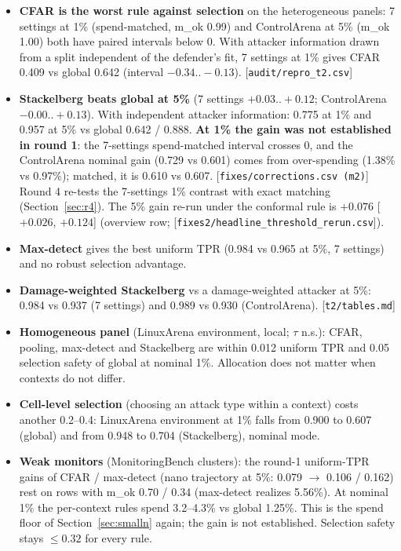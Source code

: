 \documentclass[11pt]{article}
\newcommand{\src}[1]{{\footnotesize\textcolor{ink2}{[\nolinkurl{#1}]}}}
\begin{document}
\begin{itemize}
\item \textbf{CFAR is the worst rule against selection} on the heterogeneous panels: 7 settings at 1\% (spend-matched, m\_ok 0.99) and ControlArena at 5\% (m\_ok 1.00) both have paired intervals below 0. With attacker information drawn from a split independent of the defender's fit, 7 settings at 1\% gives CFAR 0.409 vs global 0.642 (interval $-0.34..-0.13$). \src{audit/repro_t2.csv}
\item \textbf{Stackelberg beats global at 5\%} (7 settings $+0.03..+0.12$; ControlArena $-0.00..+0.13$). With independent attacker information: 0.775 at 1\% and 0.957 at 5\% vs global 0.642 / 0.888. \textbf{At 1\% the gain was not established in round 1}: the 7-settings spend-matched interval crosses 0, and the ControlArena nominal gain (0.729 vs 0.601) comes from over-spending (1.38\% vs 0.97\%); matched, it is 0.610 vs 0.607. \src{fixes/corrections.csv (m2)} Round 4 re-tests the 7-settings 1\% contrast with exact matching (Section~\ref{sec:r4}). The 5\% gain re-run under the conformal rule is $+0.076$ [$+0.026$, $+0.124$] (overview row; \src{fixes2/headline_threshold_rerun.csv}).
\item \textbf{Max-detect} gives the best uniform TPR (0.984 vs 0.965 at 5\%, 7 settings) and no robust selection advantage.
\item \textbf{Damage-weighted Stackelberg} vs a damage-weighted attacker at 5\%: 0.984 vs 0.937 (7 settings) and 0.989 vs 0.930 (ControlArena). \src{t2/tables.md}
\item \textbf{Homogeneous panel} (LinuxArena environment, local; $\tau$ n.s.): CFAR, pooling, max-detect and Stackelberg are within 0.012 uniform TPR and 0.05 selection safety of global at nominal 1\%. Allocation does not matter when contexts do not differ.
\item \textbf{Cell-level selection} (choosing an attack type within a context) costs another 0.2--0.4: LinuxArena environment at 1\% falls from 0.900 to 0.607 (global) and from 0.948 to 0.704 (Stackelberg), nominal mode.
\item \textbf{Weak monitors} (MonitoringBench clusters): the round-1 uniform-TPR gains of CFAR / max-detect (nano trajectory at 5\%: 0.079 $\to$ 0.106 / 0.162) rest on rows with m\_ok 0.70 / 0.34 (max-detect realizes 5.56\%). At nominal 1\% the per-context rules spend 3.2--4.3\% vs global 1.25\%. This is the spend floor of Section~\ref{sec:smalln} again; the gain is not established. Selection safety stays $\le0.32$ for every rule.
\end{itemize}
\end{document}
